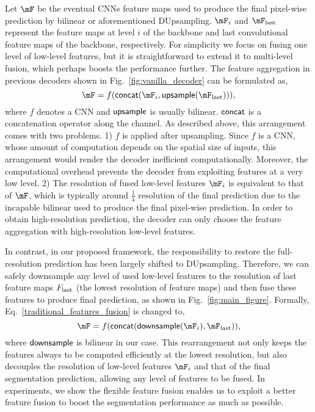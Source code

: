 \documentclass[10pt,twocolumn,letterpaper]{article}
\def\concat{{\sf concat}}
\def\downsample{{\sf downsample}}
\def\upsample{{\sf upsample}}
\newcommand{\1}{{\mathbbm{1}}}
\begin{document}
Let $\mF$ be the eventual CNNs feature maps used to produce the final pixel-wise prediction by bilinear or aforementioned DUpsampling. $\mF_i$ and $\mF_{\rm last}$ represent the feature maps at level $i$ of the backbone and last convolutional feature maps of the backbone, respectively.  For simplicity we focus on fusing one level of low-level features, but it is straightforward to extend it to multi-level fusion, which perhaps boosts the performance further. The feature aggregation in previous decoders shown in Fig.~\ref{fig:vanilla_decoder} can be formulated as,
\begin{equation}
\label{traditional_features_fusion}
    \mF = f(\concat(\mF_i, \upsample(\mF_{\rm last}))),
\end{equation}
where $ f $ denotes a CNN and $\upsample$ is usually bilinear.
$ \concat $ is a concatenation operator  along the channel. As described above, this arrangement comes with two problems. 1)  $f$ is applied after upsampling. Since $f$ is a CNN, whose amount of computation depends on the spatial size of inputs, this arrangement would render the decoder inefficient computationally. Moreover, the computational overhead prevents the decoder from exploiting features at a very low level. 2) The resolution of fused low-level features $\mF_i$ is equivalent to that of $\mF$,
which is typically around $ \frac{1}{4} $  resolution of the final prediction due to the incapable bilinear used to produce the final pixel-wise prediction. In order to obtain high-resolution prediction, the decoder can only choose the feature aggregation with high-resolution low-level features.

In contrast, in our proposed framework, the  responsibility to restore the full-resolution prediction has been largely shifted to DUpsampling. Therefore, we can safely downsample  any level of used low-level features to the resolution of last feature maps $F_{\rm last}$ (the lowest resolution of feature maps) and then fuse these features to produce final prediction, as shown in Fig.~\ref{fig:main_figure}. Formally, Eq.~\eqref{traditional_features_fusion} is changed to,
\begin{equation} \label{proposed_features_fusion}
\mF = f(
\concat(\downsample(\mF_i), \mF_{\rm last})),
\end{equation}
where $\downsample$ is bilinear in our case. This rearrangement not only keeps the features always to be computed efficiently at the lowest resolution, but also decouples the resolution of low-level features $\mF_i$ and that of the final segmentation prediction, allowing any level of features to be fused. In experiments, we show the flexible feature fusion enables us to exploit a better feature fusion to boost the segmentation performance as much as possible.
\end{document}
